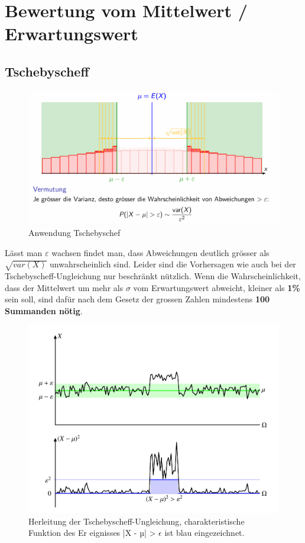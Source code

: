 \documentclass[../Main.tex]{subfiles}
\begin{document}
\section{Bewertung vom Mittelwert / Erwartungswert}

\subsection{Tschebyscheff}
\begin{figure}[H]
    \centering
    \includegraphics[width=0.75\linewidth]{Images/tschebyschef.png}
    \caption{Anwendung Tschebyschef}
\end{figure}

Lässt man \(\varepsilon\) wachsen findet man,
dass Abweichungen deutlich grösser als \(\sqrt{var(X)}\) unwahrscheinlich sind.  
Leider sind die Vorhersagen wie auch bei der
Tschebyscheff-Ungleichung nur beschränkt nützlich.
Wenn die Wahrscheinlichkeit, dass der Mittelwert um mehr
als \(\sigma\) vom Erwartungswert abweicht, kleiner als
\textbf{1\% } sein soll, sind dafür nach dem Gesetz der grossen Zahlen
mindestens \textbf{100 Summanden nötig}. 

\begin{figure}[H]
    \centering
    \includegraphics[width=0.75\linewidth]{Images/Tschebyscheff-Ungleichung.png}
    \caption{Herleitung der Tschebyscheff-Ungleichung, charakteristische Funktion des Er eignisses |X - µ| > \(\epsilon\) ist blau eingezeichnet. }
\end{figure}
\end{document}
